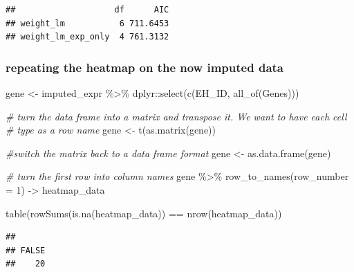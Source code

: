 \documentclass[
]{article}
\newenvironment{Shaded}{\begin{snugshade}}{\end{snugshade}}
\newcommand{\AttributeTok}[1]{\textcolor[rgb]{0.77,0.63,0.00}{#1}}
\newcommand{\CommentTok}[1]{\textcolor[rgb]{0.56,0.35,0.01}{\textit{#1}}}
\newcommand{\DecValTok}[1]{\textcolor[rgb]{0.00,0.00,0.81}{#1}}
\newcommand{\FunctionTok}[1]{\textcolor[rgb]{0.00,0.00,0.00}{#1}}
\newcommand{\NormalTok}[1]{#1}
\newcommand{\OtherTok}[1]{\textcolor[rgb]{0.56,0.35,0.01}{#1}}
\newcommand{\SpecialCharTok}[1]{\textcolor[rgb]{0.00,0.00,0.00}{#1}}
\begin{document}
\begin{verbatim}
##                    df      AIC
## weight_lm           6 711.6453
## weight_lm_exp_only  4 761.3132
\end{verbatim}

\hypertarget{repeating-the-heatmap-on-the-now-imputed-data}{%
\subsubsection{repeating the heatmap on the now imputed
data}\label{repeating-the-heatmap-on-the-now-imputed-data}}

\begin{Shaded}
\begin{Highlighting}[]
\NormalTok{gene }\OtherTok{\textless{}{-}}\NormalTok{ imputed\_expr }\SpecialCharTok{\%\textgreater{}\%}\NormalTok{ dplyr}\SpecialCharTok{::}\FunctionTok{select}\NormalTok{(}\FunctionTok{c}\NormalTok{(EH\_ID, }\FunctionTok{all\_of}\NormalTok{(Genes)))}
 
 \CommentTok{\# turn the data frame into a matrix and transpose it. We want to have each cell }
 \CommentTok{\# type as a row name }
\NormalTok{ gene }\OtherTok{\textless{}{-}} \FunctionTok{t}\NormalTok{(}\FunctionTok{as.matrix}\NormalTok{(gene))}
 
 \CommentTok{\#switch the matrix back to a data frame format}
\NormalTok{ gene }\OtherTok{\textless{}{-}} \FunctionTok{as.data.frame}\NormalTok{(gene)}
 
 \CommentTok{\# turn the first row into column names}
\NormalTok{ gene }\SpecialCharTok{\%\textgreater{}\%}
     \FunctionTok{row\_to\_names}\NormalTok{(}\AttributeTok{row\_number =} \DecValTok{1}\NormalTok{) }\OtherTok{{-}\textgreater{}}\NormalTok{ heatmap\_data}
 
 
 \FunctionTok{table}\NormalTok{(}\FunctionTok{rowSums}\NormalTok{(}\FunctionTok{is.na}\NormalTok{(heatmap\_data)) }\SpecialCharTok{==} \FunctionTok{nrow}\NormalTok{(heatmap\_data))}
\end{Highlighting}
\end{Shaded}

\begin{verbatim}
## 
## FALSE 
##    20
\end{verbatim}
\end{document}
